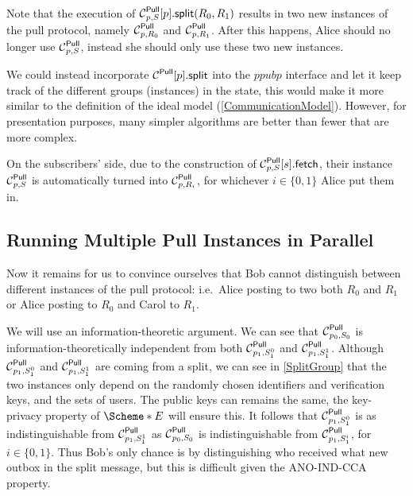 Note that the execution of \(\psplit[p, S]{p}[R_0, R_1]\) results in two new 
instances of the pull protocol, namely \(\Pull[p, R_0]\) and \(\Pull[p, R_1]\).
After this happens, Alice should no longer use \(\Pull[p, S]\), instead she 
should only use these two new instances.

We could instead incorporate \(\psplit{p}\) into the \(ppub{p}\) interface and 
let it keep track of the different groups (instances) in the state, this would 
make it more similar to the definition of the ideal model 
(\cref{CommunicationModel}).
However, for presentation purposes, many simpler algorithms are better than 
fewer that are more complex.

On the subscribers' side, due to the construction of \(\pget[p, S]{s}\), their 
instance \(\Pull[p, S]\) is automatically turned into \(\Pull[p, R_i]\), for 
whichever \(i\in \{0, 1\}\) Alice put them in.

\subsection{Running Multiple Pull Instances in Parallel}
\label{ParallelPull}

Now it remains for us to convince ourselves that Bob cannot distinguish between
different instances of the pull protocol: i.e.\ Alice posting to two both 
\(R_0\) and \(R_1\) or Alice posting to \(R_0\) and Carol to \(R_1\).

We will use an information-theoretic argument.
We can see that \(\Pull[p_0, S_0]\) is information-theoretically independent 
from both \(\Pull[p_1, S_1^0]\) and \(\Pull[p_1, S_1^1]\).
Although \(\Pull[p_1, S_1^0]\) and \(\Pull[p_1, S_1^1]\) are coming from 
a split, we can see in \cref{SplitGroup} that the two instances only depend 
on the randomly chosen identifiers and verification keys, and the sets of 
users.
The public keys can remains the same, the key-privacy property of \(\E*\) will 
ensure this.
It follows that \(\Pull[p_1, S_1^0]\) is as indistinguishable from \(\Pull[p_1, 
  S_1^1]\) as \(\Pull[p_0, S_0]\) is indistinguishable from \(\Pull[p_1, 
  S_1^i]\), for \(i\in \{0, 1\}\).
Thus Bob's only chance is by distinguishing who received what new outbox in the 
split message, but this is difficult given the ANO-IND-CCA property.


